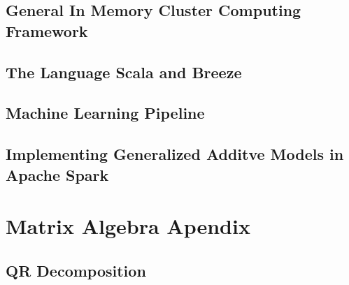 \documentclass{article}
\begin{document}
        \subsection{General In Memory Cluster Computing Framework}
        \subsection{The Language Scala and Breeze}
        \subsection{Machine Learning Pipeline}
        \subsection{Implementing Generalized Additve Models in Apache Spark}
    
    \section{Matrix Algebra Apendix}
        \subsection{QR Decomposition}
        
    


    \newpage


    \newpage
\end{document}

